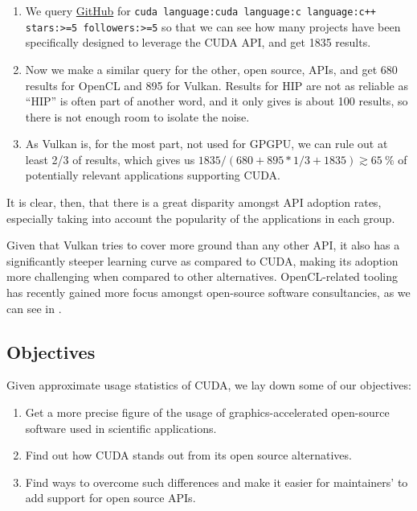 \documentclass[11pt, conference, onecolumn, final]{IEEEtran}
\begin{document}
\begin{enumerate}
    \item We query \href{https://github.com}{GitHub} for
        \verb|cuda language:cuda language:c language:c++ stars:>=5 followers:>=5|
        so that we can see how many projects have been specifically designed to
        leverage the CUDA API, and get 1835 results.
    \item Now we make a similar query for the other, open source, APIs, and get
        680 results for OpenCL and 895 for Vulkan. Results for HIP are not as
        reliable as ``HIP'' is often part of another word, and it only gives is
        about 100 results, so there is not enough room to isolate the noise.
    \item As Vulkan is, for the most part, not used for GPGPU, we can rule out
        at least 2/3 of results, which gives us $ 1835 / (680 + 895 * 1/3 +
        1835) \gtrsim \qty{65}{\percent} $ of potentially relevant applications
        supporting CUDA.
\end{enumerate}

It is clear, then, that there is a great disparity amongst API adoption rates,
especially taking into account the popularity of the applications in each
group.

Given that Vulkan tries to cover more ground than any other API, it also has a
significantly steeper learning curve as compared to CUDA, making its adoption
more challenging when compared to other alternatives.
OpenCL-related tooling has recently gained more focus amongst open-source
software consultancies, as we can see in \cite{MachineL70:online}.

\subsection{Objectives} \label{sec:intro:objectives}

Given approximate usage statistics of CUDA, we lay down some of our objectives:

\begin{enumerate}
    \item\label{obj1} Get a more precise figure of the usage of
        graphics-accelerated open-source software used in scientific
        applications.
    \item\label{obj2} Find out how CUDA stands out from its open source
        alternatives.
    \item\label{obj3} Find ways to overcome such differences and make it easier
        for maintainers' to add support for open source APIs.
\end{enumerate}
\end{document}
